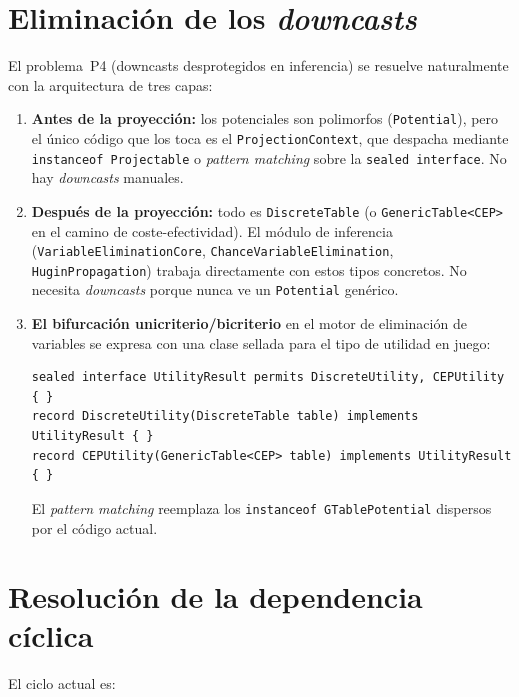 \documentclass[11pt,a4paper]{article}
\newcommand{\code}[1]{\texttt{#1}}
\begin{document}
\section{Eliminación de los \emph{downcasts}}
\label{sec:ideal-downcasts}

El problema~P4 (downcasts desprotegidos en inferencia) se resuelve
naturalmente con la arquitectura de tres capas:

\begin{enumerate}
  \item \textbf{Antes de la proyección:} los potenciales son polimorfos
        (\code{Potential}), pero el único código que los toca es el
        \code{ProjectionContext}, que despacha mediante \code{instanceof
        Projectable} o \emph{pattern matching} sobre la \code{sealed interface}.
        No hay \emph{downcasts} manuales.

  \item \textbf{Después de la proyección:} todo es \code{DiscreteTable} (o
        \code{GenericTable<CEP>} en el camino de coste-efectividad).  El
        módulo de inferencia (\code{VariableEliminationCore},
        \code{ChanceVariableElimination}, \code{HuginPropagation}) trabaja
        directamente con estos tipos concretos.  No necesita \emph{downcasts}
        porque nunca ve un \code{Potential} genérico.

  \item \textbf{El bifurcación unicriterio/bicriterio} en el motor de
        eliminación de variables se expresa con una clase sellada para
        el tipo de utilidad en juego:
\begin{lstlisting}
sealed interface UtilityResult permits DiscreteUtility, CEPUtility { }
record DiscreteUtility(DiscreteTable table) implements UtilityResult { }
record CEPUtility(GenericTable<CEP> table) implements UtilityResult { }
\end{lstlisting}
        El \emph{pattern matching} reemplaza los \code{instanceof GTablePotential}
        dispersos por el código actual.
\end{enumerate}

\section{Resolución de la dependencia cíclica}
\label{sec:ideal-ciclo}

El ciclo actual es:
\end{document}
